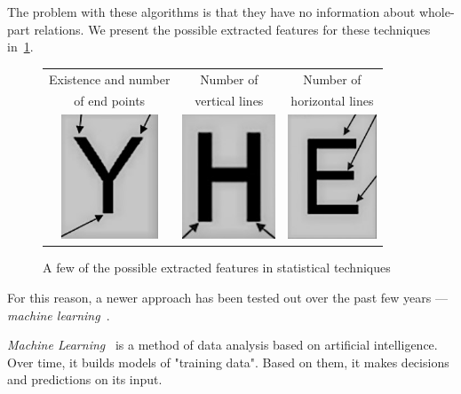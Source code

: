 The problem with these algorithms is that they have no information about whole-part relations. We present the possible extracted features for these techniques in~\cref{fig:characterClassificationStatis}.

\begin{figure}[t]
\centering
{\sffamily
\begin{tabular}{ccc}
Existence and number & Number of & Number of \\
of end points & vertical lines & horizontal lines \\
\includegraphics[height=10em]{img/characterClassification/statis_endPoint.jpg}
&
\includegraphics[height=10em]{img/characterClassification/statis_vertical.jpg}
&
\includegraphics[height=10em]{img/characterClassification/statis_horizontal.jpg} \\
\end{tabular}
}
\caption{A few of the possible extracted features in statistical techniques~\citep{vithlani2015structural}}
\label{fig:characterClassificationStatis}
\end{figure}

For this reason, a newer approach has been tested out over the past few years --- \emph{machine learning}~\citep{characterClassification}.

 \emph{Machine Learning}~\citep{sebastiani2002machine} is a method of data analysis based on artificial intelligence. Over time, it builds models of "training data". Based on them, it makes decisions and predictions on its input. 

